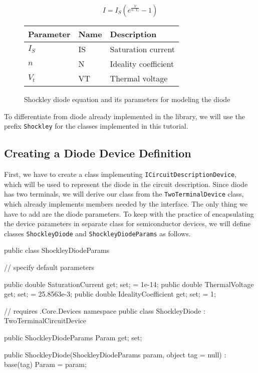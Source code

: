 \begin{figure}[h]
	\centering
	
	\[ I = I_S \left(e^{\frac{V}{n \cdot V_t}} - 1 \right) \]
	
	\begin{tabular}{|l|l|l|}
		\hline 
		Parameter & Name & Description \\ \hline \hline
		$I_S$ & IS & Saturation current \\ \hline
		$n$ & N & Ideality coefficient \\ \hline
		$V_t$ & VT & Thermal voltage \\ \hline
		
	\end{tabular}
	
	\caption{Shockley diode equation and its parameters for modeling the diode}
	\label{fig:userdocs:tutorial:diode-params}
\end{figure}


To differentiate from diode already implemented in the library, we will use the prefix \texttt{Shockley} for the classes implemented in this tutorial.

\subsection{Creating a Diode Device Definition}
First, we have to create a class implementing \texttt{ICircuitDescriptionDevice}, which will be used to represent the diode in the circuit description. Since diode has two terminals, we will derive our class from the \texttt{TwoTerminalDevice} class, which already implements members needed by the interface. The only thing we have to add are the diode parameters. To keep with the practice of encapsulating the device parameters in separate class for semiconductor devices, we will define classes \texttt{ShockleyDiode} and \texttt{ShockleyDiodeParams} as follows.

\begin{csharpcode}
public class ShockleyDiodeParams
{
	// specify default parameters
	
	public double SaturationCurrent { get; set; } = 1e-14;
	public double ThermalVoltage { get; set; } = 25.8563e-3;
	public double IdealityCoefficient { get; set; } = 1;
}

// requires .Core.Devices namespace
public class ShockleyDiode : TwoTerminalCircuitDevice
{
	public ShockleyDiodeParams Param { get; set; }
	
	public ShockleyDiode(ShockleyDiodeParams param, object tag = null) 
		: base(tag)
	{
		Param = param;
	}
}
\end{csharpcode}

